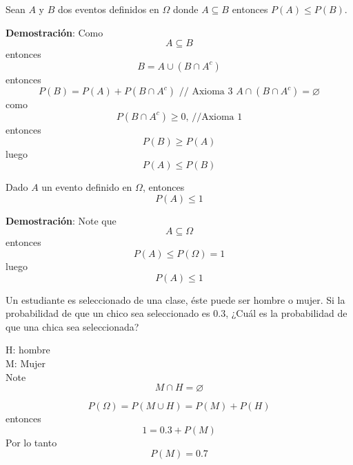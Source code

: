 \begin{theorem}
Sean $A$ y $B$ dos eventos definidos en $\Omega$ donde $A\subseteq B$ entonces $P(A)\leq P(B)$.
\end{theorem}

\textbf{Demostración}: Como 
\begin{equation*}
A\subseteq B
\end{equation*}
entonces
\begin{equation*}
B=A\cup (B\cap A^{c})
\end{equation*}
entonces
\begin{equation*}
P(B)=P(A)+P(B\cap A^{c})\text{ // Axioma 3 }A\cap (B\cap A^{c})=\varnothing 
\end{equation*}
como
\begin{equation*}
P(B\cap A^{c})\geq 0\text{, //Axioma 1}
\end{equation*}
entonces
\begin{equation*}
P(B)\geq P(A)
\end{equation*}
luego
\begin{equation*}
P(A)\leq P(B)
\end{equation*}

\begin{theorem}
Dado $A$ un evento definido en $\Omega$, entonces
\begin{equation*}
P(A)\leq 1
\end{equation*}
\end{theorem}

\textbf{Demostración}: Note que 
\begin{equation*}
A\subseteq \Omega
\end{equation*}
entonces
\begin{equation*}
P(A)\leq P(\Omega )=1
\end{equation*}
luego
\begin{equation*}
P(A)\leq 1
\end{equation*}


\begin{exercise}
Un estudiante es seleccionado de una clase, éste puede ser hombre o mujer. Si la probabilidad de que un chico sea seleccionado es $0.3$, ¿Cuál es la probabilidad de que una chica sea seleccionada?    
\end{exercise}

\begin{solution}
H: hombre\\
M: Mujer\\
Note\\
\begin{equation*}
M\cap H=\varnothing
\end{equation*}

\begin{equation*}
P(\Omega )=P(M\cup H)=P(M)+P(H)
\end{equation*}
entonces 
\begin{equation*}
1=0.3+P(M)
\end{equation*}
Por lo tanto
\begin{equation*}
P(M)=0.7
\end{equation*}
\end{solution}


